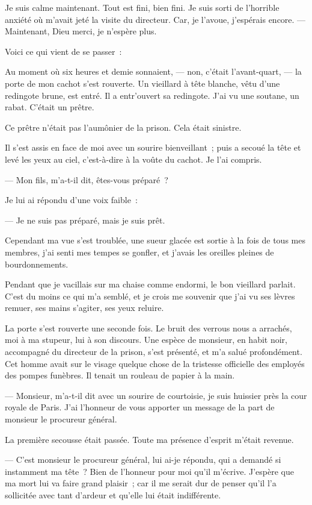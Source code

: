 \documentclass[french,twoside]{book} %
\begin{document}
\noindent Je suis calme maintenant. Tout est fini, bien fini. Je suis sorti de l’horrible anxiété où m’avait jeté la visite du directeur. Car, je l’avoue, j’espérais encore. — Maintenant, Dieu merci, je n’espère plus.\par
Voici ce qui vient de se passer :\par
Au moment où six heures et demie sonnaient, — non, c’était l’avant-quart, — la porte de mon cachot s’est rouverte. Un vieillard à tête blanche, vêtu d’une redingote brune, est entré. Il a entr’ouvert sa redingote. J’ai vu une soutane, un rabat. C’était un prêtre.\par
Ce prêtre n’était pas l’aumônier de la prison. Cela était sinistre.\par
Il s’est assis en face de moi avec un sourire bienveillant ; puis a secoué la tête et levé les yeux au ciel, c’est-à-dire à la voûte du cachot. Je l’ai compris.\par
— Mon fils, m’a-t-il dit, êtes-vous préparé ?\par
Je lui ai répondu d’une voix faible :\par
— Je ne suis pas préparé, mais je suis prêt.\par
Cependant ma vue s’est troublée, une sueur glacée est sortie à la fois de tous mes membres, j’ai senti mes tempes se gonfler, et j’avais les oreilles pleines de bourdonnements.\par
 Pendant que je vacillais sur ma chaise comme endormi, le bon vieillard parlait. C’est du moins ce qui m’a semblé, et je crois me souvenir que j’ai vu ses lèvres remuer, ses mains s’agiter, ses yeux reluire.\par
La porte s’est rouverte une seconde fois. Le bruit des verrous nous a arrachés, moi à ma stupeur, lui à son discours. Une espèce de monsieur, en habit noir, accompagné du directeur de la prison, s’est présenté, et m’a salué profondément. Cet homme avait sur le visage quelque chose de la tristesse officielle des employés des pompes funèbres. Il tenait un rouleau de papier à la main.\par
— Monsieur, m’a-t-il dit avec un sourire de courtoisie, je suis huissier près la cour royale de Paris. J’ai l’honneur de vous apporter un message de la part de monsieur le procureur général.\par
La première secousse était passée. Toute ma présence d’esprit m’était revenue.\par
— C’est monsieur le procureur général, lui ai-je répondu, qui a demandé si instamment ma tête ? Bien de l’honneur pour moi qu’il m’écrive. J’espère que ma mort lui va faire grand plaisir ; car il me serait dur de penser qu’il l’a sollicitée avec tant d’ardeur et qu’elle lui était indifférente.\par
\end{document}
